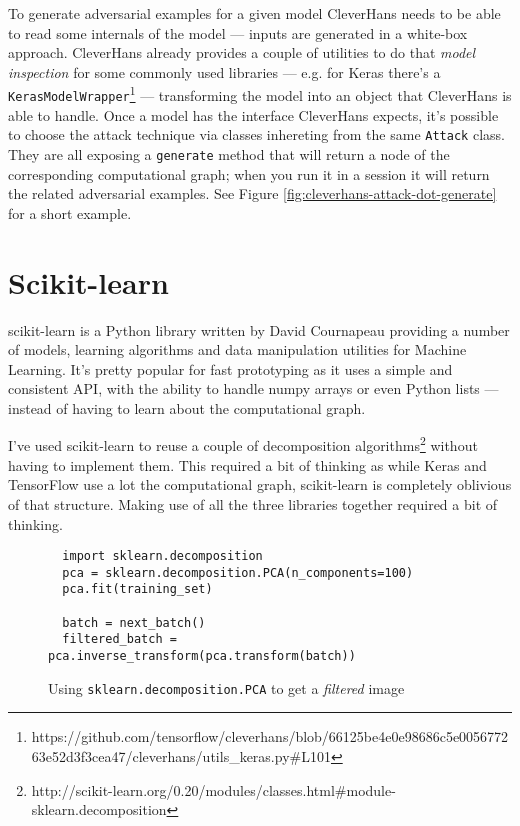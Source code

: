 To generate adversarial examples for a given model CleverHans needs to
be able to read some internals of the model --- inputs are generated in
a white-box approach. CleverHans already provides a couple of utilities
to do that \emph{model inspection} for some commonly used libraries ---
e.g. for Keras there's a
\texttt{KerasModelWrapper}\footnote{https://github.com/tensorflow/cleverhans/blob/66125be4e0e98686c5e005677263e52d3f3cea47/cleverhans/utils\_keras.py\#L101}
--- transforming the model into an object that CleverHans is able to
handle. Once a model has the interface CleverHans expects, it's
possible to choose the attack technique via classes inhereting from the
same \texttt{Attack} class. They are all exposing a \texttt{generate}
method that will return a node of the corresponding computational
graph; when you run it in a session it will return the related
adversarial examples. See Figure
\ref{fig:cleverhans-attack-dot-generate} for a short example.

\section{Scikit-learn}
\label{sec:sklearn}

scikit-learn is a Python library written by David Cournapeau providing
a number of models, learning algorithms and data manipulation utilities
for Machine Learning. It's pretty popular for fast prototyping as it
uses a simple and consistent API, with the ability to handle numpy
arrays or even Python lists --- instead of having to learn about the
computational graph.

I've used scikit-learn to reuse a couple of decomposition
algorithms\footnote{http://scikit-learn.org/0.20/modules/classes.html\#module-sklearn.decomposition}
without having to implement them. This required a bit of thinking as
while Keras and TensorFlow use a lot the computational graph,
scikit-learn is completely oblivious of that structure. Making use of
all the three libraries together required a bit of thinking.

\begin{figure}
  \begin{verbatim}
  import sklearn.decomposition
  pca = sklearn.decomposition.PCA(n_components=100)
  pca.fit(training_set)

  batch = next_batch()
  filtered_batch = pca.inverse_transform(pca.transform(batch))
  \end{verbatim}
  \caption{Using \texttt{sklearn.decomposition.PCA} to get a
    \emph{filtered} image}
  \label{fig:transform-inverse_transform}
\end{figure}

